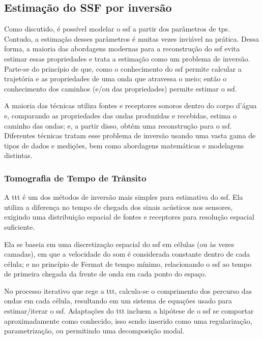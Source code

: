 \subsection{Estimação do SSF por inversão}
\label{subsec:sec1:estimacao_ssf_por_inversao}

Como discutido, é possível modelar o \gls{ssf} a partir dos parâmetros de \gls{tps}. Contudo, a estimação desses parâmetros é muitas vezes inviável na prática. Dessa forma, a maioria das abordagens modernas para a reconstrução do \gls{ssf} evita estimar essas propriedades e trata a estimação como um problema de inversão. Parte-se do princípio de que, como o conhecimento do \gls{ssf} permite calcular a trajetória e as propriedades de uma onda que atravessa o meio; então o conhecimento dos caminhos (e/ou das propriedades) permite estimar o \gls{ssf}.

A maioria das técnicas utiliza fontes e receptores sonoros dentro do corpo d'água e, comparando as propriedades das ondas produzidas e recebidas, estima o caminho das ondas; e, a partir disso, obtém uma reconstrução para o \gls{ssf}. Diferentes técnicas tratam esse problema de inversão usando uma vasta gama de tipos de dados e medições, bem como abordagens matemáticas e modelagens distintas.

\subsubsection*{Tomografia de Tempo de Trânsito}

A \gls{ttt} \cite{bormann_seismic_2012,stefanov_travel_2019} é um dos métodos de inversão mais simples para estimativa do \gls{ssf}. Ela utiliza a diferença no tempo de chegada dos sinais acústicos nos sensores, exigindo uma distribuição espacial de fontes e receptores para resolução espacial suficiente.

Ela se baseia em uma discretização espacial do \gls{ssf} em células (ou às vezes camadas), em que a velocidade do som é considerada constante dentro de cada célula; e no princípio de Fermat de tempo mínimo, relacionando o \gls{ssf} ao tempo de primeira chegada da frente de onda em cada ponto do espaço.

No processo iterativo que rege a \gls{ttt}, calcula-se o comprimento dos percurso das ondas em cada célula, resultando em um sistema de equações usado para estimar/iterar o \gls{ssf}. Adaptações do \gls{ttt} incluem a hipótese de o \gls{ssf} se comportar aproximadamente como conhecido, isso sendo inserido como uma regularização, parametrização, ou permitindo uma decomposição modal.

